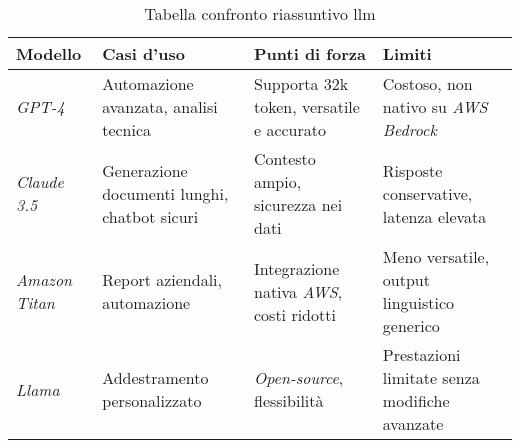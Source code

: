 \begin{table}%
    \label{tab:confronto-lllm}
    \begin{tabularx}{\textwidth}{|X|X|X|X|}
    \hline
    \textbf{Modello} & \textbf{Casi d'uso} & \textbf{Punti di forza} & \textbf{Limiti}\\
    \hline
    \textit{GPT-4} & Automazione avanzata, analisi tecnica & Supporta 32k \gls{token}, versatile e accurato & Costoso, non nativo su \textit{AWS Bedrock}   \\
    \hline
    \textit{Claude 3.5} & Generazione documenti lunghi, chatbot sicuri & Contesto ampio, sicurezza nei dati & Risposte conservative, latenza elevata \\
    \hline
    \textit{Amazon Titan} & Report aziendali, automazione & Integrazione nativa \textit{AWS}, costi ridotti & Meno versatile, output linguistico generico \\
    \hline
    \textit{Llama} & Addestramento personalizzato & \textit{Open-source}, flessibilità & Prestazioni limitate senza modifiche avanzate \\
    \hline
    \end{tabularx}
    \caption{Tabella confronto riassuntivo \gls{llm}}
    \end{table}%
